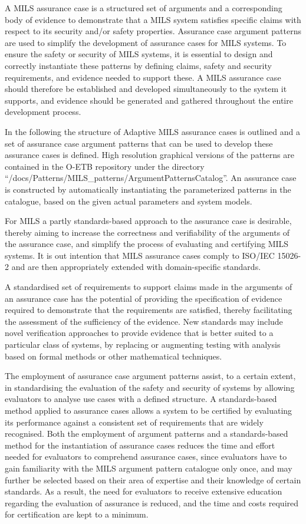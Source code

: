 \documentclass[12pt,twoside,a4paper]{article}
\begin{document}
A MILS assurance case is a structured set of arguments and a corresponding body of evidence to demonstrate that a MILS system satisfies specific claims with respect to its security and/or safety properties. Assurance case argument patterns are used to simplify the development of assurance cases for MILS systems. To ensure the safety or security of MILS systems, it is essential to design and correctly instantiate these patterns by defining claims, safety and security requirements, and evidence needed to support these. A MILS assurance case should therefore be established and developed simultaneously to the system it supports, and evidence should be generated and gathered throughout the entire development process.

In the following the structure of Adaptive MILS assurance cases is outlined and a set of assurance case argument patterns that can be used to develop these assurance cases is defined. High resolution graphical versions of the patterns are contained in the O-ETB repository under the directory ``/docs/Patterns/MILS\_patterns/ArgumentPatternsCatalog''. An assurance case is constructed by automatically instantiating the parameterized patterns in the catalogue, based on the given actual parameters and system models.

For MILS a partly standards-based approach to the assurance case is desirable, thereby aiming to increase the correctness and verifiability of the arguments of the assurance case, and simplify the process of evaluating and certifying MILS systems.
It is out intention that MILS assurance cases comply to ISO/IEC 15026-2 \cite{ISO-15026-2} and are then appropriately extended with domain-specific standards.

A standardised set of requirements to support claims made in the arguments of an assurance case has the potential of providing the specification of evidence required to demonstrate that the requirements are satisfied, thereby facilitating the assessment of the sufficiency of the evidence. New standards may include novel verification approaches to provide evidence that is better suited to a particular class of systems, by replacing or augmenting testing with analysis based on formal methods or other mathematical techniques.

The employment of assurance case argument patterns assist, to a certain extent, in standardising the evaluation of the safety and security of systems by allowing evaluators to analyse use cases with a defined structure. A standards-based method applied to assurance cases allows a system to be certified by evaluating its performance against a consistent set of requirements that are widely recognised. Both the employment of argument patterns and a standards-based method for the instantiation of assurance cases reduces the time and effort needed for evaluators to comprehend assurance cases, since evaluators have to gain familiarity with the MILS argument pattern catalogue only once, and may further be selected based on their area of expertise and their knowledge of certain standards. As a result, the need for evaluators to receive extensive education regarding the evaluation of assurance is reduced, and the time and costs required for certification are kept to a minimum.
\end{document}
